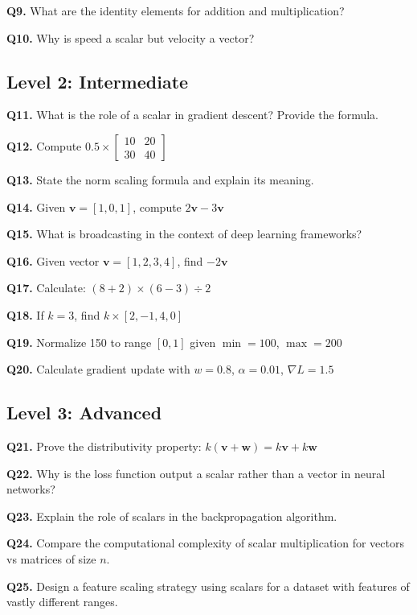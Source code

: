\documentclass[11pt,a4paper]{article}
\begin{document}
\textbf{Q9.} What are the identity elements for addition and multiplication?

\textbf{Q10.} Why is speed a scalar but velocity a vector?

\subsection{Level 2: Intermediate}

\textbf{Q11.} What is the role of a scalar in gradient descent? Provide the formula.

\textbf{Q12.} Compute $0.5 \times \begin{bmatrix} 10 & 20 \\ 30 & 40 \end{bmatrix}$

\textbf{Q13.} State the norm scaling formula and explain its meaning.

\textbf{Q14.} Given $\mathbf{v} = [1, 0, 1]$, compute $2\mathbf{v} - 3\mathbf{v}$

\textbf{Q15.} What is broadcasting in the context of deep learning frameworks?

\textbf{Q16.} Given vector $\mathbf{v} = [1, 2, 3, 4]$, find $-2\mathbf{v}$

\textbf{Q17.} Calculate: $(8 + 2) \times (6 - 3) \div 2$

\textbf{Q18.} If $k = 3$, find $k \times [2, -1, 4, 0]$

\textbf{Q19.} Normalize 150 to range $[0, 1]$ given $\min=100$, $\max=200$

\textbf{Q20.} Calculate gradient update with $w=0.8$, $\alpha=0.01$, $\nabla L=1.5$

\subsection{Level 3: Advanced}

\textbf{Q21.} Prove the distributivity property: $k(\mathbf{v} + \mathbf{w}) = k\mathbf{v} + k\mathbf{w}$

\textbf{Q22.} Why is the loss function output a scalar rather than a vector in neural networks?

\textbf{Q23.} Explain the role of scalars in the backpropagation algorithm.

\textbf{Q24.} Compare the computational complexity of scalar multiplication for vectors vs matrices of size $n$.

\textbf{Q25.} Design a feature scaling strategy using scalars for a dataset with features of vastly different ranges.
\end{document}
